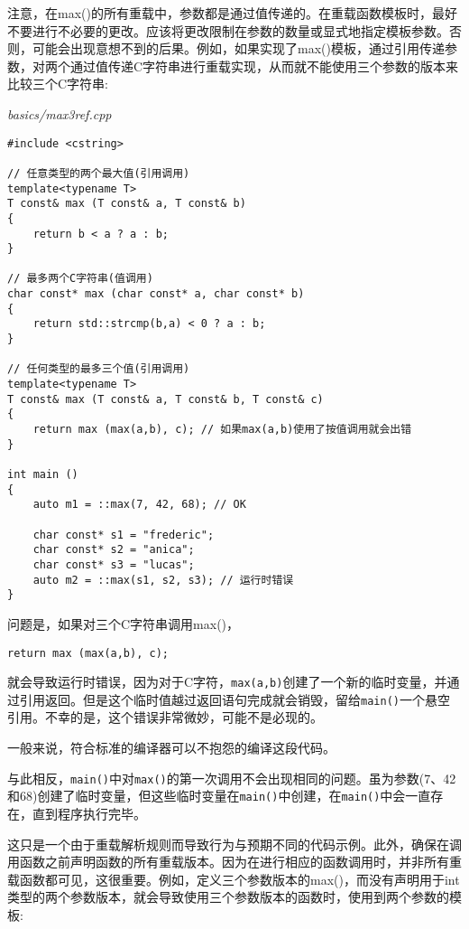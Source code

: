 注意，在max()的所有重载中，参数都是通过值传递的。在重载函数模板时，最好不要进行不必要的更改。应该将更改限制在参数的数量或显式地指定模板参数。否则，可能会出现意想不到的后果。例如，如果实现了max()模板，通过引用传递参数，对两个通过值传递C字符串进行重载实现，从而就不能使用三个参数的版本来比较三个C字符串:

\noindent
\textit{basics/max3ref.cpp}
\begin{lstlisting}[style=styleCXX]
#include <cstring>

// 任意类型的两个最大值(引用调用)
template<typename T>
T const& max (T const& a, T const& b)
{
	return b < a ? a : b;
}

// 最多两个C字符串(值调用)
char const* max (char const* a, char const* b)
{
	return std::strcmp(b,a) < 0 ? a : b;
}

// 任何类型的最多三个值(引用调用)
template<typename T>
T const& max (T const& a, T const& b, T const& c)
{
	return max (max(a,b), c); // 如果max(a,b)使用了按值调用就会出错
}

int main ()
{
	auto m1 = ::max(7, 42, 68); // OK
	
	char const* s1 = "frederic";
	char const* s2 = "anica";
	char const* s3 = "lucas";
	auto m2 = ::max(s1, s2, s3); // 运行时错误
}
\end{lstlisting}

问题是，如果对三个C字符串调用max()，

\begin{lstlisting}[style=styleCXX]
return max (max(a,b), c);
\end{lstlisting}

就会导致运行时错误，因为对于C字符，\texttt{max(a,b)}创建了一个新的临时变量，并通过引用返回。但是这个临时值越过返回语句完成就会销毁，留给\texttt{main()}一个悬空引用。不幸的是，这个错误非常微妙，可能不是必现的。

\begin{tcolorbox}[colback=webgreen!5!white,colframe=webgreen!75!black]
\hspace*{0.75cm}一般来说，符合标准的编译器可以不抱怨的编译这段代码。
\end{tcolorbox}

与此相反，\texttt{main()}中对\texttt{max()}的第一次调用不会出现相同的问题。虽为参数(7、42和68)创建了临时变量，但这些临时变量在\texttt{main()}中创建，在\texttt{main()}中会一直存在，直到程序执行完毕。

这只是一个由于重载解析规则而导致行为与预期不同的代码示例。此外，确保在调用函数之前声明函数的所有重载版本。因为在进行相应的函数调用时，并非所有重载函数都可见，这很重要。例如，定义三个参数版本的max()，而没有声明用于int类型的两个参数版本，就会导致使用三个参数版本的函数时，使用到两个参数的模板:

